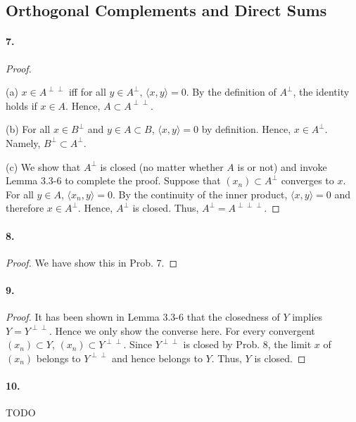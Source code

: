 \subsection{Orthogonal Complements and Direct Sums}
  \paragraph{7.}
  \begin{proof}
    $\,$\par
    (a) $x\in A^{\perp\perp}$ iff for all $y\in A^\perp$, $\langle x, y\rangle=
    0$. By the definition of $A^\perp$, the identity holds if $x\in A$. Hence,
    $A\subset A^{\perp\perp}$.\par
    (b) For all $x\in B^\perp$ and $y\in A\subset B$, $\langle x, y\rangle=0$ by
    definition. Hence, $x\in A^\perp$. Namely, $B^\perp\subset A^\perp$.\par
    (c) We show that $A^\perp$ is closed (no matter whether $A$ is or not) and
    invoke Lemma 3.3-6 to complete the proof. Suppose that $(x_n)\subset 
    A^\perp$ converges to $x$. For all $y\in A$, $\langle x_n, y\rangle=0$. By
    the continuity of the inner product, $\langle x, y\rangle=0$ and therefore
    $x\in A^\perp$. Hence, $A^\perp$ is closed. Thus, $A^\perp=A^{\perp\perp
    \perp}$.
  \end{proof}
  
  \paragraph{8.}
  \begin{proof}
    We have show this in Prob. 7.
  \end{proof}
  
  \paragraph{9.}
  \begin{proof}
    It has been shown in Lemma 3.3-6 that the closedness of $Y$ implies $Y=Y^{
    \perp\perp}$. Hence we only show the converse here. For every convergent 
    $(x_n)\subset Y$, $(x_n)\subset Y^{\perp\perp}$. Since $Y^{\perp\perp}$ is
    closed by Prob. 8, the limit $x$ of $(x_n)$ belongs to $Y^{\perp\perp}$ and
    hence belongs to $Y$. Thus, $Y$ is closed.
  \end{proof}
  
  \paragraph{10.} TODO

